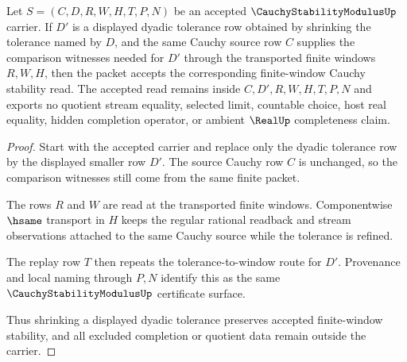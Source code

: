 \begin{theorem}
\label{thm:cauchy-stability-modulus-finite-window-stability}
Let $S=(C,D,R,W,H,T,P,N)$ be an accepted $\CauchyStabilityModulusUp$ carrier. If $D'$ is a displayed dyadic tolerance row obtained by shrinking the tolerance named by $D$, and the same Cauchy source row $C$ supplies the comparison witnesses needed for $D'$ through the transported finite windows $R,W,H$, then the packet accepts the corresponding finite-window Cauchy stability read. The accepted read remains inside $C,D',R,W,H,T,P,N$ and exports no quotient stream equality, selected limit, countable choice, host real equality, hidden completion operator, or ambient $\RealUp$ completeness claim.
\end{theorem}
\begin{proof}
Start with the accepted carrier and replace only the dyadic tolerance row by the displayed smaller row $D'$. The source Cauchy row $C$ is unchanged, so the comparison witnesses still come from the same finite packet.

The rows $R$ and $W$ are read at the transported finite windows. Componentwise $\hsame$ transport in $H$ keeps the regular rational readback and stream observations attached to the same Cauchy source while the tolerance is refined.

The replay row $T$ then repeats the tolerance-to-window route for $D'$. Provenance and local naming through $P,N$ identify this as the same $\CauchyStabilityModulusUp$ certificate surface.

Thus shrinking a displayed dyadic tolerance preserves accepted finite-window stability, and all excluded completion or quotient data remain outside the carrier.
\end{proof}


\begin{closurestatus}{\CauchyStabilityModulusUp}
  \theoryclosure{\seedClosure}
  \formalstatus{\encodedDefV}
\end{closurestatus}

